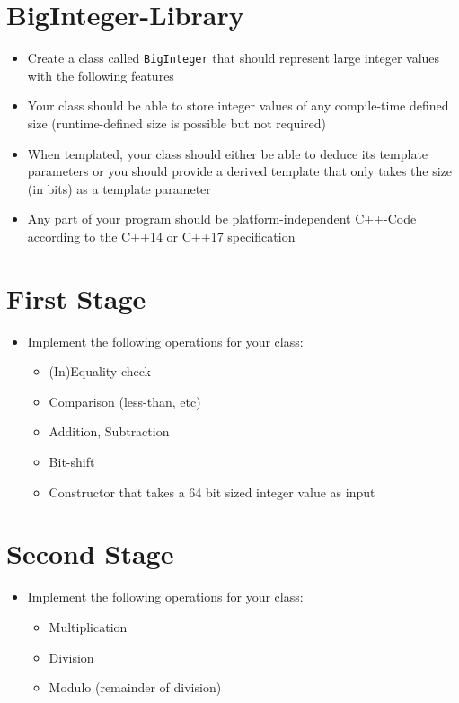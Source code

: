 \documentclass[12pt, a4paper]{article}
\begin{document}
\section*{BigInteger-Library}
\begin{itemize}
    \item Create a class called \lstinline{BigInteger} that should represent large integer values with the following features
    \item Your class should be able to store integer values of any compile-time defined size (runtime-defined size is possible but not required)
    \item When templated, your class should either be able to deduce its template parameters or you should provide a derived template that only takes the size (in bits) as a template parameter
    \item Any part of your program should be platform-independent C++-Code according to the C++14 or C++17 specification
\end{itemize}
\section*{First Stage}
\begin{itemize}
    \item Implement the following operations for your class:
    \begin{itemize}
        \item (In)Equality-check
        \item Comparison (less-than, etc)
        \item Addition, Subtraction
        \item Bit-shift
        \item Constructor that takes a 64 bit sized integer value as input
    \end{itemize}
\end{itemize}
\section*{Second Stage}
\begin{itemize}
    \item Implement the following operations for your class:
    \begin{itemize}
        \item Multiplication
        \item Division
        \item Modulo (remainder of division)
    \end{itemize}
\end{itemize}
\end{document}

